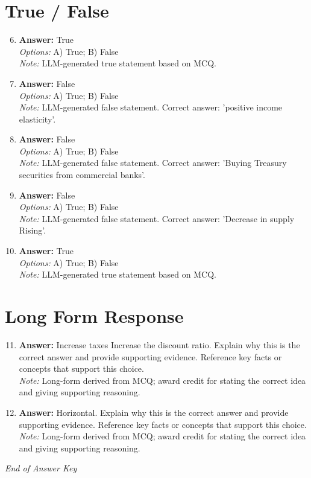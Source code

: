 \documentclass[12pt]{article}
\begin{document}
\section*{True / False}
\begin{enumerate}[label=\arabic*.]
\setcounter{enumi}{5}
\item \textbf{Answer:} True
\\ \textit{Options:} A) True; B) False
\\ \textit{Note:} LLM-generated true statement based on MCQ.
\item \textbf{Answer:} False
\\ \textit{Options:} A) True; B) False
\\ \textit{Note:} LLM-generated false statement. Correct answer: 'positive income elasticity'.
\item \textbf{Answer:} False
\\ \textit{Options:} A) True; B) False
\\ \textit{Note:} LLM-generated false statement. Correct answer: 'Buying Treasury securities from commercial banks'.
\item \textbf{Answer:} False
\\ \textit{Options:} A) True; B) False
\\ \textit{Note:} LLM-generated false statement. Correct answer: 'Decrease in supply Rising'.
\item \textbf{Answer:} True
\\ \textit{Options:} A) True; B) False
\\ \textit{Note:} LLM-generated true statement based on MCQ.
\end{enumerate}

\section*{Long Form Response}
\begin{enumerate}[label=\arabic*.]
\setcounter{enumi}{10}
\item \textbf{Answer:} Increase taxes Increase the discount ratio. Explain why this is the correct answer and provide supporting evidence. Reference key facts or concepts that support this choice.
\\ \textit{Note:} Long-form derived from MCQ; award credit for stating the correct idea and giving supporting reasoning.
\item \textbf{Answer:} Horizontal. Explain why this is the correct answer and provide supporting evidence. Reference key facts or concepts that support this choice.
\\ \textit{Note:} Long-form derived from MCQ; award credit for stating the correct idea and giving supporting reasoning.
\end{enumerate}

\vfill
\noindent\textit{End of Answer Key}
\end{document}
